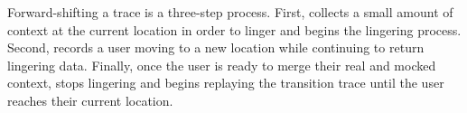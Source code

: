 Forward-shifting a trace is a three-step process. First, \PocketMocker{}
collects a small amount of context at the current location in order to linger
and begins the lingering process. Second, \PocketMocker{} records a user
moving to a new location while continuing to return lingering data. Finally,
once the user is ready to merge their real and mocked context,
\PocketMocker{} stops lingering and begins replaying the transition trace
until the user reaches their current location.
